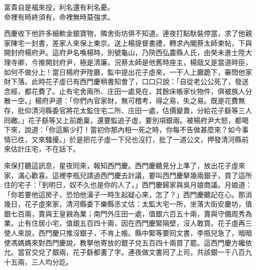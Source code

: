\begin{myquote}
富貴自是福來投，利名還有利名憂。\\命裡有時終須有，命裡無時莫強求。
\end{myquote}

西慶收下他許多細軟金銀寶物，隣舍街坊俱不知道。連夜打點馱裝停當，求了他親家陳宅一封書，差家人來保上東京。送上楊提督書禮，轉求內閣蔡太師柬帖，下與開封府楊府尹。這府尹名喚楊時，別號龜山，乃陝西弘農縣人氏，由癸未進士陞大理寺卿，今推開封府尹，極是清廉。況蔡太師是他舊時座主，楊戩又是當道時臣，如何不做分上！{}當日楊府尹陞廳，監中提出花子虛來，一干人上廳跪下，審問他家財下落。此時花子虛已有西門慶稍書知會了，口口只說：「自從老公公死了，發送念經，都花費了。止有宅舍兩所、庄田一處見在，其餘床帳家伙物件，俱被族人分散一空。」楊府尹道：「你們內官家財，無可稽考，得之易，失之易。既是花費無存，批仰清河縣委官將花太監住宅二所、庄田一處，估價變賣，分給花子繇等三人囘繳。」花子繇等又上前跪稟，還要監追子虛，要別項銀兩。被楊府尹大怒，都喝下來，說道：「你這厮少打！當初你那內相一死之時，你每不告做甚麼來？如今事情已徃，又來騷擾。」於是把花子虛一下兒也沒打，批了一道公文，押發清河縣前來估計庄宅，不在話下。

來保打聽這訊息，星夜囘來，報知西門慶。西門慶聽見分上準了，放出花子虛來家，滿心歡喜。這裡李瓶兒請過西門慶去計議，要叫西門慶拏幾兩銀子，買了這所住的宅子：「到明日，奴不久也是你的人了。」{}西門慶歸家與吳月娘商議。月娘道：「你若要他這房子，恐怕他漢子一時生起疑心來，怎了？」西門慶聽記在心。那消幾日，花子虛來家，清河縣委下樂縣丞丈估：太監大宅一所，坐落大街安慶坊，值銀七百兩，賣與王皇親為業；南門外庄田一處，值銀六百五十兩，賣與守備周秀為業。止有住居小宅，值銀五百四十兩，因在西門慶緊隔壁，沒人敢買。花子虛再三使人來說，西門慶只推沒銀子，不肯上帳。縣中緊等要囘文書，李瓶兒急了，暗暗使馮媽媽來對西門慶說，教拏他寄放的銀子兌五百四十兩買了罷。這西門慶方纔依允。當官交兌了銀兩，花子繇都畫了字。連夜做文書囘了上司，共該銀一千八百九十五兩，三人均分訖。

